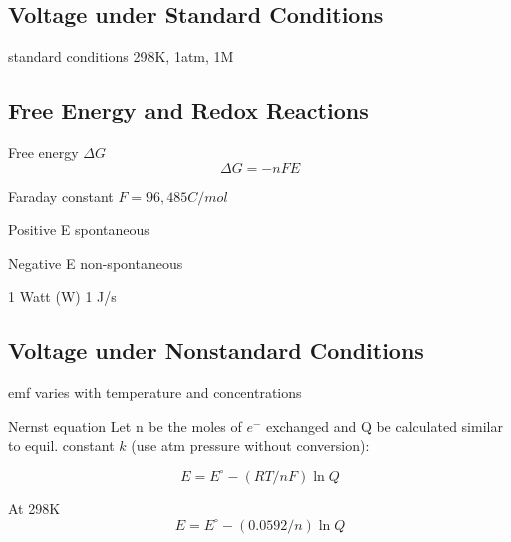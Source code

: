 \begin{mdframed}
\begin{multicols}{2}

\subsection{Voltage under Standard Conditions}
\begin{compactdesc}
    \item[standard conditions] 298K, 1atm, 1M
    \item[]
    \item[]
    \item[]
    \item[]
\end{compactdesc}

\subsection{Free Energy and Redox Reactions}
\begin{compactdesc}
    \item[Free energy $\Delta G$]
        \[
            \Delta G = -nFE
        \]
    \item[Faraday constant] $F = 96,485 C/mol$
    \item[Positive E] spontaneous
    \item[Negative E] non-spontaneous
    \item[1 Watt (W)] 1 J/s
\end{compactdesc}


\subsection{Voltage under Nonstandard Conditions}
\begin{compactdesc}
    \item[emf varies] with temperature and concentrations
    \item[Nernst equation] Let n be the moles of $e^{-}$ exchanged and Q be
        calculated similar to equil. constant $k$ (use atm pressure without
        conversion):

        \[
            E = E^\circ - (RT/nF) \ln Q
        \]
    \item[At 298K]
        \[
            E = E^\circ - (0.0592/n) \ln Q
        \]
\end{compactdesc}
\end{multicols}
\end{mdframed}






